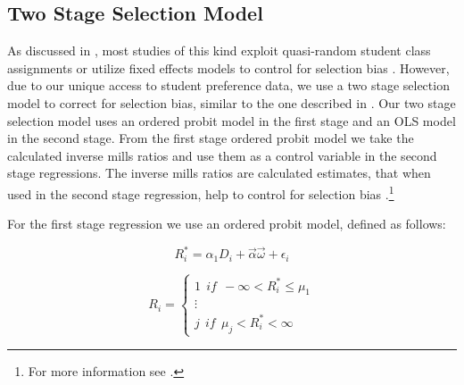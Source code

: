 \subsection{Two Stage Selection Model}\label{methods:tssmodel}

As discussed in , most studies of this kind exploit quasi-random student class assignments or utilize fixed effects models to control for selection bias \citep{kang2007classroom,carman2012classroom,schlosser2008inside,lavy2012good}. 
However, due to our unique access to student preference data, we use a two stage selection model to correct for selection bias, similar to the one described in \citet{heckman1979sample}. 
Our two stage selection model uses an ordered probit model in the first stage and an OLS model in the second stage. 
From the first stage ordered probit model we take the calculated inverse mills ratios and use them as a control variable in the second stage regressions. 
The inverse mills ratios are calculated estimates, that when used in the second stage regression, help to control for selection bias \citep{heckman1979sample}.\footnote{For more information see \citet{greene2002limdep}.}

For the first stage regression we use an ordered probit model, defined as follows:

\setlength{\belowdisplayskip}{5pt} \setlength{\belowdisplayshortskip}{1pt}
\setlength{\abovedisplayskip}{-6pt} \setlength{\abovedisplayshortskip}{1pt}

\begin{equation}\label{eq:1}
R_{i}^{*} = \alpha_{1} D_{i} + \overrightarrow{\alpha} \overrightarrow{\omega} + \epsilon_{i}
\end{equation}

\setlength{\belowdisplayskip}{11pt} \setlength{\belowdisplayshortskip}{1pt}
\setlength{\abovedisplayskip}{-4pt} \setlength{\abovedisplayshortskip}{1pt}

\begin{equation}\label{eq:2}
R_{i} = 
\begin{cases}
  1 \ \ if \ \ - \infty < R_{i}^{*} \leq \mu_{1} \\
  \vdots \\
  j \ \ if \ \ \mu_{j} < R_{i}^{*} < \infty
\end{cases}
\end{equation}

